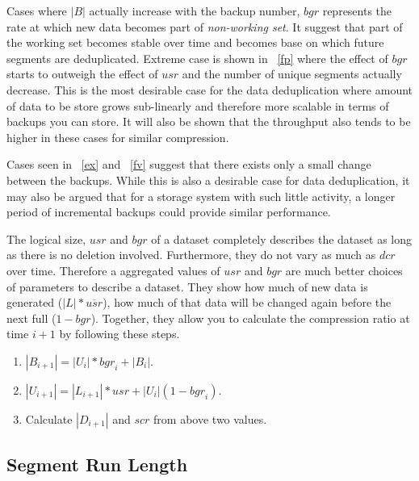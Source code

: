 Cases where $|B|$ actually increase with the backup number, $bgr$ represents the rate at which new data becomes part of \emph{non-working set}. It suggest that part of the working set becomes stable over time and becomes base on which future segments are deduplicated. Extreme case is shown in \figurename~\ref{fp} where the effect of $bgr$ starts to outweigh the effect of $\mathit{usr}$ and the number of unique segments actually decrease. This is the most desirable case for the data deduplication where amount of data to be store grows sub-linearly and therefore more scalable in terms of backups you can store. It will also be shown that the throughput also tends to be higher in these cases for similar compression.

Cases seen in \figurename~\ref{ex} and \figurename~\ref{fv} suggest that there exists only a small change between the backups. While this is also a desirable case for data deduplication, it may also be argued that for a storage system with such little activity, a longer period of incremental backups could provide similar performance. 

The logical size, $usr$ and $bgr$ of a dataset completely describes the dataset as long as there is no deletion involved. Furthermore, they do not vary as much as $dcr$ over time. Therefore a aggregated values of $usr$ and $bgr$ are much better choices of parameters to describe a dataset. They show how much of new data is generated ($|L|*\overline{\mathit{usr}}$), how much of that data will be changed again before the next full ($1-\mathit{bgr}$). Together, they allow you to calculate the compression ratio at time $i+1$ by following these steps. 
\begin{enumerate}
\item{$|B_{i+1}|=|U_{i}|*\mathit{bgr}_i+|B_i|$.}
\item{$|U_{i+1}|=|L_{i+1}|*\mathit{usr}+|U_i|(1-\mathit{bgr}_i)$.}
\item{Calculate $|D_{i+1}|$ and $\mathit{scr}$ from above two values.}
\end{enumerate}

\subsection{Segment Run Length}

